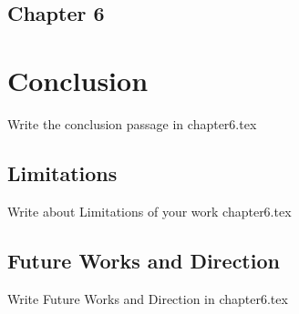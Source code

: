 \begin{center}
    \section*{\fontsize{20}{20}\selectfont Chapter 6}
\end{center}
\vspace{10mm}

\section{Conclusion}
Write the conclusion passage in chapter6.tex

\subsection{Limitations}
Write about Limitations of your work chapter6.tex

\subsection{Future Works and Direction}
Write Future Works and Direction in chapter6.tex